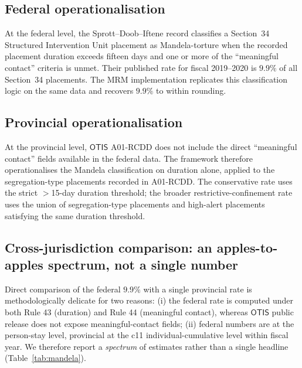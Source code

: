 \documentclass[article,shortnames,nojss]{jss}
\newcommand{\OTIS}{\textsf{OTIS}}
\begin{document}
\subsection{Federal operationalisation}

At the federal level, the Sprott--Doob--Iftene record
\citep{SprottDoob2023} classifies a Section~34 Structured
Intervention Unit placement as Mandela-torture when the recorded
placement duration exceeds fifteen days and one or more of the
``meaningful contact'' criteria is unmet. Their published rate for
fiscal 2019--2020 is $9.9\%$ of all Section~34 placements. The
MRM implementation replicates this classification logic on the
same data and recovers $9.9\%$ to within rounding.

\subsection{Provincial operationalisation}

At the provincial level, $\OTIS$ A01-RCDD does not include the
direct ``meaningful contact'' fields available in the federal
data. The framework therefore operationalises the Mandela
classification on duration alone, applied to the segregation-type
placements recorded in A01-RCDD. The conservative rate uses the
strict $>$15-day duration threshold; the broader
restrictive-confinement rate uses the union of segregation-type
placements and high-alert placements satisfying the same duration
threshold.

\subsection{Cross-jurisdiction comparison: an apples-to-apples
spectrum, not a single number}
\label{sec:mandela-comparison}

Direct comparison of the federal $9.9\%$
\citep{SprottDoob2023} with a single provincial rate is
methodologically delicate for two reasons: (i) the federal rate
is computed under both Rule 43 (duration) and Rule 44 (meaningful
contact), whereas $\OTIS{}$ public release does not expose
meaningful-contact fields; (ii) federal numbers are at the
person-stay level, provincial at the c11 individual-cumulative
level within fiscal year.  We therefore report a
\emph{spectrum} of estimates rather than a single headline
(Table~\ref{tab:mandela}).
\end{document}

